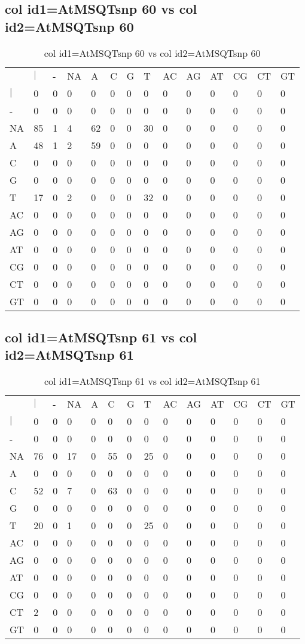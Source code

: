 \subsection{col id1=AtMSQTsnp 60 vs col id2=AtMSQTsnp 60}
\begin{center}
\begin{longtable}{|l|l|l|l|l|l|l|l|l|l|l|l|l|l|}
\caption{col id1=AtMSQTsnp 60 vs col id2=AtMSQTsnp 60} \label{table_dm950}\\
\hline
\\
\hline
&$|$&-&NA&A&C&G&T&AC&AG&AT&CG&CT&GT\\
$|$&0&0&0&0&0&0&0&0&0&0&0&0&0\\
-&0&0&0&0&0&0&0&0&0&0&0&0&0\\
NA&85&1&4&62&0&0&30&0&0&0&0&0&0\\
A&48&1&2&59&0&0&0&0&0&0&0&0&0\\
C&0&0&0&0&0&0&0&0&0&0&0&0&0\\
G&0&0&0&0&0&0&0&0&0&0&0&0&0\\
T&17&0&2&0&0&0&32&0&0&0&0&0&0\\
AC&0&0&0&0&0&0&0&0&0&0&0&0&0\\
AG&0&0&0&0&0&0&0&0&0&0&0&0&0\\
AT&0&0&0&0&0&0&0&0&0&0&0&0&0\\
CG&0&0&0&0&0&0&0&0&0&0&0&0&0\\
CT&0&0&0&0&0&0&0&0&0&0&0&0&0\\
GT&0&0&0&0&0&0&0&0&0&0&0&0&0\\
\hline
\end{longtable}
\end{center}

\subsection{col id1=AtMSQTsnp 61 vs col id2=AtMSQTsnp 61}
\begin{center}
\begin{longtable}{|l|l|l|l|l|l|l|l|l|l|l|l|l|l|}
\caption{col id1=AtMSQTsnp 61 vs col id2=AtMSQTsnp 61} \label{table_dm952}\\
\hline
\\
\hline
&$|$&-&NA&A&C&G&T&AC&AG&AT&CG&CT&GT\\
$|$&0&0&0&0&0&0&0&0&0&0&0&0&0\\
-&0&0&0&0&0&0&0&0&0&0&0&0&0\\
NA&76&0&17&0&55&0&25&0&0&0&0&0&0\\
A&0&0&0&0&0&0&0&0&0&0&0&0&0\\
C&52&0&7&0&63&0&0&0&0&0&0&0&0\\
G&0&0&0&0&0&0&0&0&0&0&0&0&0\\
T&20&0&1&0&0&0&25&0&0&0&0&0&0\\
AC&0&0&0&0&0&0&0&0&0&0&0&0&0\\
AG&0&0&0&0&0&0&0&0&0&0&0&0&0\\
AT&0&0&0&0&0&0&0&0&0&0&0&0&0\\
CG&0&0&0&0&0&0&0&0&0&0&0&0&0\\
CT&2&0&0&0&0&0&0&0&0&0&0&0&0\\
GT&0&0&0&0&0&0&0&0&0&0&0&0&0\\
\hline
\end{longtable}
\end{center}

